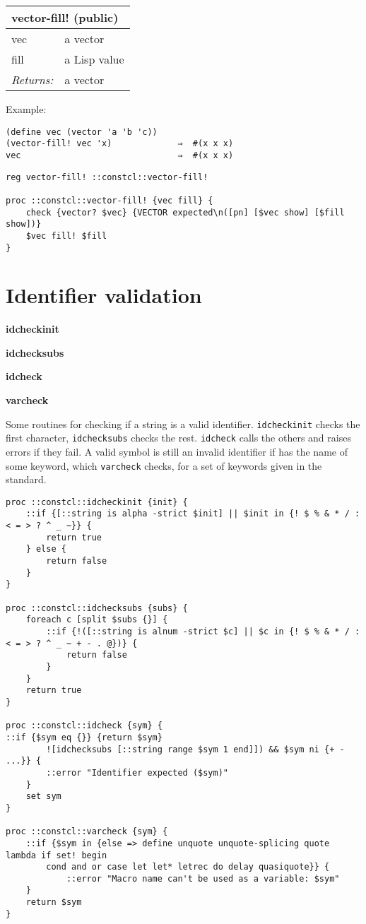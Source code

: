 \documentclass{report}
\begin{document}
\begin{tabular}{ |l l| }
\hline
\multicolumn{2}{|l|}{vector-fill! (public)} \\
\hline
vec & a vector \\
fill & a Lisp value \\
\textit{Returns:} & a vector \\
\hline
\end{tabular}


Example:

\noindent\makebox[\linewidth]{\rule{\linewidth}{0.4pt}}
\begin{lstlisting}
(define vec (vector 'a 'b 'c))
(vector-fill! vec 'x)             ⇒  #(x x x)
vec                               ⇒  #(x x x)
\end{lstlisting}
\noindent\makebox[\linewidth]{\rule{\linewidth}{0.4pt}}
\noindent\makebox[\linewidth]{\rule{\linewidth}{0.4pt}}
\begin{lstlisting}
reg vector-fill! ::constcl::vector-fill!
 
proc ::constcl::vector-fill! {vec fill} {
    check {vector? $vec} {VECTOR expected\n([pn] [$vec show] [$fill show])}
    $vec fill! $fill
}
\end{lstlisting}
\noindent\makebox[\linewidth]{\rule{\linewidth}{0.4pt}}
\section{Identifier validation}
\label{identifier-validation}

\textbf{idcheckinit}


\textbf{idchecksubs}


\textbf{idcheck}


\textbf{varcheck}


Some routines for checking if a string is a valid identifier. \texttt{idcheckinit} checks the first character, \texttt{idchecksubs} checks the rest. \texttt{idcheck} calls the others and raises errors if they fail. A valid symbol is still an invalid identifier if has the name of some keyword, which \texttt{varcheck} checks, for a set of keywords given in the standard.

\noindent\makebox[\linewidth]{\rule{\linewidth}{0.4pt}}
\begin{lstlisting}
proc ::constcl::idcheckinit {init} {
    ::if {[::string is alpha -strict $init] || $init in {! $ % & * / : < = > ? ^ _ ~}} {
        return true
    } else {
        return false
    }
}
 
proc ::constcl::idchecksubs {subs} {
    foreach c [split $subs {}] {
        ::if {!([::string is alnum -strict $c] || $c in {! $ % & * / : < = > ? ^ _ ~ + - . @})} {
            return false
        }
    }
    return true
}
 
proc ::constcl::idcheck {sym} {
::if {$sym eq {}} {return $sym}
        ![idchecksubs [::string range $sym 1 end]]) && $sym ni {+ - ...}} {
        ::error "Identifier expected ($sym)"
    }
    set sym
}
 
proc ::constcl::varcheck {sym} {
    ::if {$sym in {else => define unquote unquote-splicing quote lambda if set! begin
        cond and or case let let* letrec do delay quasiquote}} {
            ::error "Macro name can't be used as a variable: $sym"
    }
    return $sym
}
\end{lstlisting}
\noindent\makebox[\linewidth]{\rule{\linewidth}{0.4pt}}
\end{document}
